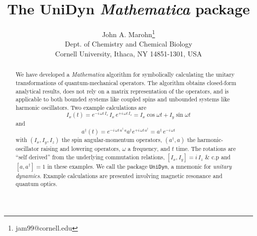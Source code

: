 \documentclass[12pt,letterpaper]{refart}
\begin{document}
\sloppy

\title{The UniDyn \emph{Mathematica} package}
\author{
	John A. Marohn\thanks{jam99@cornell.edu} \\ 
	{\footnotesize Dept. of Chemistry and Chemical Biology} \\ 
	{\footnotesize Cornell University, Ithaca, NY 14851-1301, USA}
}
\maketitle

\begin{abstract}
We have developed a \emph{Mathematica} algorithm for symbolically calculating the unitary transformations of quantum-mechanical operators.  The algorithm obtains closed-form analytical results, does not rely on a matrix representation of the operators, and is applicable to both bounded systems like coupled spins and unbounded systems like harmonic oscillators.  Two example calculations are  
\[
	I_{x}(t) 
		= e^{-i \, \omega t \, I_z} \, I_x \, e^{+i \, \omega t \, I_z} 
		= I_x \cos{\omega t} + I_y \sin{\omega t}
\]
and
\[
	a^{\dagger}(t)
		= e^{-i \, \omega t \, a^{\dagger} \, a} a^{\dagger} e^{+i \, \omega t \, a^{\dagger}} 
		= a^{\dagger} \, e^{-i \, \omega t}
\] 
with $(I_x, I_y, I_z)$ the spin angular-momentum operators, $(a^{\dagger}, a)$ the harmonic-oscillator raising and lowering operators, $\omega$ a frequency, and $t$ time.  The rotations are ``self derived'' from the underlying commutation relations, $[I_x, I_y] = i \, I_z$ \& c.p and $[a, a^{\dagger}] = 1$ in these examples.  We call the package \verb+UniDyn+, a mnemonic for \emph{unitary dynamics}.  Example calculations are presented involving magnetic resonance and quantum optics.  
\end{abstract}

\pagestyle{fancy}  %

	\cfoot{\thepage}
	
\renewcommand{\headrulewidth}{0.4pt} %
\renewcommand{\footrulewidth}{0.4pt} %
\end{document}
